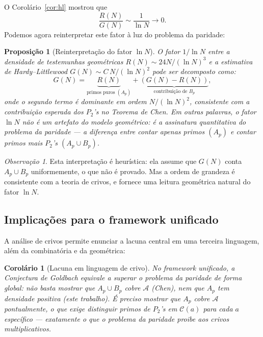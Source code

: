 \documentclass[12pt,a4paper]{article}
\newtheorem{proposition}[theorem]{Proposi\c{c}\~ao}
\newtheorem{corollary}[theorem]{Corol\'ario}
\theoremstyle{remark}
\newtheorem{remark}[theorem]{Observa\c{c}\~ao}
\newcommand{\calA}{\mathcal{A}}
\begin{document}
	O Corol\'ario~\ref{cor:hl} mostrou que
	\[
	\frac{R(N)}{G(N)} \sim \frac{1}{\ln N} \to 0.
	\]
	Podemos agora reinterpretar este fator \`a luz do problema da paridade:
	
	\begin{proposition}[Reinterpretação do fator $\ln N$]
		\label{prop:fator-ln}
		O fator $1/\ln N$ entre a densidade de testemunhas geom\'etricas $R(N) \sim 24N/(\ln N)^3$
		e a estimativa de Hardy--Littlewood $G(N) \sim C\,N/(\ln N)^2$ pode ser decomposto como:
		\[
		G(N) = \underbrace{R(N)}_{\text{primos puros }(A_p)} + \underbrace{(G(N) - R(N))}_{\text{contribui\c{c}\~ao de }B_p},
		\]
		onde o segundo termo \'e dominante em ordem $N/(\ln N)^2$, consistente com a contribui\c{c}\~ao
		esperada dos $P_2$'s no Teorema de Chen.
		Em outras palavras, o fator $\ln N$ n\~ao \'e um artefato do modelo geom\'etrico:
		\'e a \emph{assinatura quantitativa do problema da paridade} --- a diferen\c{c}a entre
		contar apenas primos $(A_p)$ e contar primos mais $P_2$'s $(A_p \cup B_p)$.
	\end{proposition}
	
	\begin{remark}
		Esta interpreta\c{c}\~ao \'e heur\'istica: ela assume que $G(N)$ conta $A_p \cup B_p$
		uniformemente, o que n\~ao \'e provado. Mas a ordem de grandeza \'e consistente
		com a teoria de crivos, e fornece uma leitura geom\'etrica natural do fator $\ln N$.
	\end{remark}
	
	\subsection{Implica\c{c}\~oes para o framework unificado}
	
	A an\'alise de crivos permite enunciar a lacuna central em uma terceira linguagem,
	al\'em da combinat\'oria e da geom\'etrica:
	
	\begin{corollary}[Lacuna em linguagem de crivo]
		No framework unificado, a Conjectura de Goldbach equivale a superar o problema
		da paridade de forma \emph{global}: n\~ao basta mostrar que $A_p \cup B_p$ cobre
		$\calA$ (Chen), nem que $A_p$ tem densidade positiva (este trabalho).
		\'E preciso mostrar que $A_p$ cobre $\calA$ \emph{pontualmente}, o que exige
		distinguir primos de $P_2$'s em $\mathcal{C}(a)$ para cada $a$ espec\'ifico ---
		exatamente o que o problema da paridade proibe aos crivos multiplicativos.
	\end{corollary}
	
\end{document}
